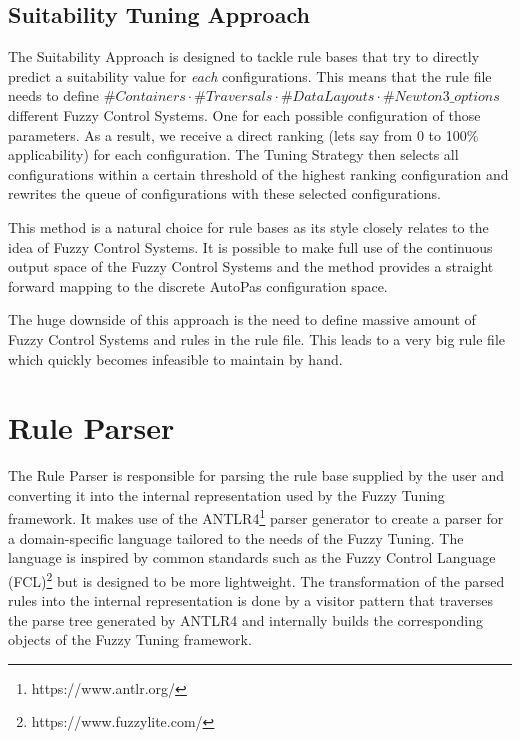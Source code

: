 


\subsection{Suitability Tuning Approach}

The Suitability Approach is designed to tackle rule bases that try to directly predict a suitability value for \emph{each} configurations. This means that the rule file needs to define $\#Containers \cdot \#Traversals \cdot \#DataLayouts \cdot \#Newton3\_options$ different Fuzzy Control Systems. One for each possible configuration of those parameters. As a result, we receive a direct ranking (lets say from 0 to 100\% applicability) for each configuration. The Tuning Strategy then selects all configurations within a certain threshold of the highest ranking configuration and rewrites the queue of configurations with these selected configurations.

This method is a natural choice for rule bases as its style closely relates to the idea of Fuzzy Control Systems. It is possible to make full use of the continuous output space of the Fuzzy Control Systems and the method provides a straight forward mapping to the discrete AutoPas configuration space.

The huge downside of this approach is the need to define massive amount of Fuzzy Control Systems and rules in the rule file. This leads to a very big rule file which quickly becomes infeasible to maintain by hand.




\section{Rule Parser}

The Rule Parser is responsible for parsing the rule base supplied by the user and converting it into the internal representation used by the Fuzzy Tuning framework. It makes use of the ANTLR4\footnote{https://www.antlr.org/} parser generator to create a parser for a domain-specific language tailored to the needs of the Fuzzy Tuning. The language is inspired by common standards such as the Fuzzy Control Language (FCL)\footnote{https://www.fuzzylite.com/} but is designed to be more lightweight. The transformation of the parsed rules into the internal representation is done by a visitor pattern that traverses the parse tree generated by ANTLR4 and internally builds the corresponding objects of the Fuzzy Tuning framework.